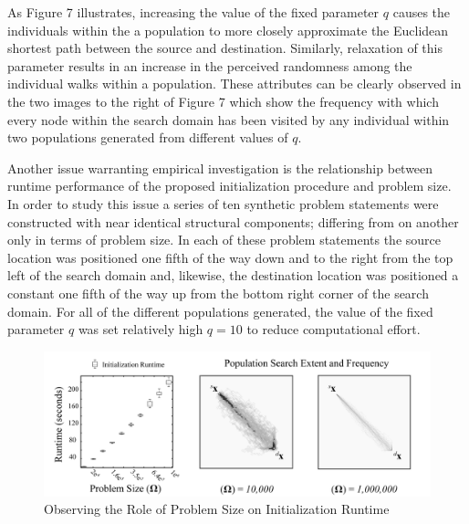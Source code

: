 As Figure 7 illustrates, increasing the value of the fixed parameter $q$ causes the individuals within the a population to more closely approximate the Euclidean shortest path between the source and destination. Similarly, relaxation of this parameter results in an increase in the perceived randomness among the individual walks within a population. These attributes can be clearly observed in the two images to the right of Figure 7 which show the frequency with which every node within the search domain has been visited by any individual within two populations generated from different values of $q$.
            
Another issue warranting empirical investigation is the relationship between runtime performance of the proposed initialization procedure and problem size. In order to study this issue a series of ten synthetic problem statements were constructed with near identical structural components; differing from on another only in terms of problem size. In each of these problem statements the source location was positioned one fifth of the way down and to the right from the top left of the search domain and, likewise, the destination location was positioned a constant one fifth of the way up from the bottom right corner of the search domain. For all of the different populations generated, the value of the fixed parameter $q$ was set relatively high $q = 10$ to reduce computational effort.
            
            \begin{figure}[Observing the Role of Problem Size on Initialization Runtime]
            \centering
            \includegraphics[width=5.5in]{figures/problem-size-study.png}
            \caption[Observing the Role of Problem Size on Initialization Runtime]{Observing the Role of Problem Size on Initialization Runtime}
            \label{fig:problem-size}
            \end{figure}
            
